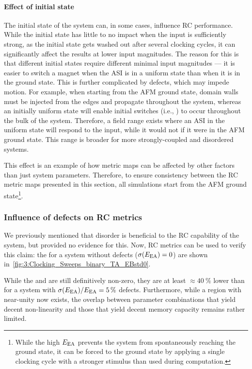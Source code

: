 \paragraph{Effect of initial state}
The initial state of the system can, in some cases, influence RC performance.
While the initial state has little to no impact when the input is sufficiently strong, as the initial state gets washed out after several clocking cycles, it can significantly affect the results at lower input magnitudes.
The reason for this is that different initial states require different minimal input  magnitudes --- it is easier to switch a magnet when the ASI is in a uniform state than when it is in the  ground state. %
This is further complicated by defects, which may impede  motion.
For example, when starting from the AFM ground state, domain walls must be injected from the edges and propagate throughout the system, whereas an initially uniform state will enable initial switches (i.e., ) to occur throughout the bulk of the system.
Therefore, a field range exists where an ASI in the uniform state will respond to the input, while it would not if it were in the AFM ground state.
This range is broader for more strongly-coupled and disordered systems. \par
This effect is an example of how metric maps can be affected by other factors than just system parameters.
Therefore, to ensure consistency between the RC metric maps presented in this section, all simulations start from the AFM ground state\footnote{
	While the high  $E_\mathrm{EA}$ prevents the system from spontaneously reaching the ground state, it can be forced to the ground state by applying a single clocking cycle with a stronger stimulus than used during computation.
}.

\subsubsection{Influence of defects on RC metrics}
We previously mentioned that disorder is beneficial to the RC capability of the system, but provided no evidence for this.
Now, RC metrics can be used to verify this claim: the  for a system without defects ($\sigma(E_\mathrm{EA}) = 0$) are shown in~\cref{fig:3:Clocking_Sweeps_binary_TA_EBstd0}. \par
While the  and  are still definitively non-zero, they are at least $\approx \SI{40}{\percent}$ lower than for a system with $\sigma(E_\mathrm{EA})/E_\mathrm{EA} = \SI{5}{\percent}$ defects.
Furthermore, while a region with near-unity  now exists, the overlap between parameter combinations that yield decent non-linearity and those that yield decent memory capacity remains rather limited.

